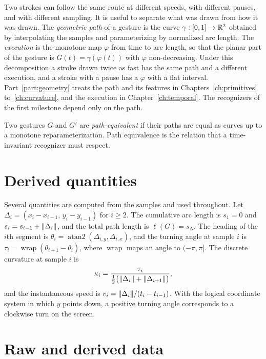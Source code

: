 Two strokes can follow the same route at different speeds, with different pauses, and with different sampling. It is useful to separate what was drawn from how it was drawn. The \emph{geometric path} of a gesture is the curve $\gamma:[0,1]\to\mathbb{R}^2$ obtained by interpolating the samples and parameterizing by normalized arc length. The \emph{execution} is the monotone map $\varphi$ from time to arc length, so that the planar part of the gesture is $G(t)=\gamma(\varphi(t))$ with $\varphi$ non-decreasing. Under this decomposition a stroke drawn twice as fast has the same path and a different execution, and a stroke with a pause has a $\varphi$ with a flat interval. Part~\ref{part:geometry} treats the path and its features in Chapters~\ref{ch:primitives} to~\ref{ch:curvature}, and the execution in Chapter~\ref{ch:temporal}. The recognizers of the first milestone depend only on the path.

\begin{definition}\label{def:path-equivalence}
Two gestures $G$ and $G'$ are \emph{path-equivalent} if their paths are equal as curves up to a monotone reparameterization. Path equivalence is the relation that a time-invariant recognizer must respect.
\end{definition}

\section{Derived quantities}

Several quantities are computed from the samples and used throughout. Let $\Delta_i=(x_{i}-x_{i-1},\,y_i-y_{i-1})$ for $i\ge2$. The cumulative arc length is $s_1=0$ and $s_i=s_{i-1}+\lVert \Delta_i\rVert$, and the total path length is $\ell(G)=s_N$. The heading of the $i$th segment is $\theta_i=\operatorname{atan2}(\Delta_{i,y},\Delta_{i,x})$, and the turning angle at sample $i$ is $\tau_i=\operatorname{wrap}(\theta_{i+1}-\theta_i)$, where $\operatorname{wrap}$ maps an angle to $(-\pi,\pi]$. The discrete curvature at sample $i$ is
\[
\kappa_i=\frac{\tau_i}{\tfrac12\bigl(\lVert \Delta_i\rVert+\lVert \Delta_{i+1}\rVert\bigr)},
\]
and the instantaneous speed is $v_i=\lVert \Delta_i\rVert/(t_i-t_{i-1})$. With the logical coordinate system in which $y$ points down, a positive turning angle corresponds to a clockwise turn on the screen.

\section{Raw and derived data}

